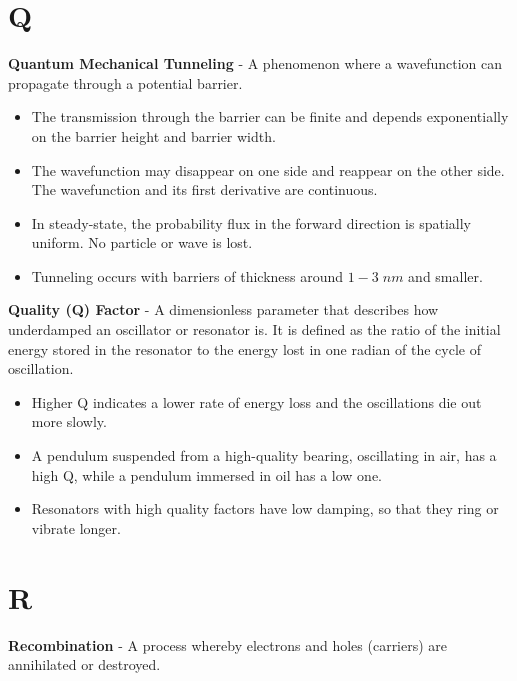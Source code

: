 \section{Q}
    \textbf{Quantum Mechanical Tunneling} - A phenomenon where a wavefunction can propagate through a potential barrier.
\vspace{0.15cm}
    \begin{itemize}
        \setlength\itemsep{0.5em}
        \item{The transmission through the barrier can be finite and depends exponentially on the barrier height and barrier width.}
        \item{The wavefunction may disappear on one side and reappear on the other side. The wavefunction and its first derivative are continuous.}
        \item{In steady-state, the probability flux in the forward direction is spatially uniform. No particle or wave is lost.}
        \item{Tunneling occurs with barriers of thickness around $1-3\;nm$ and smaller.}
    \end{itemize}
\vspace{0.5cm}
    \textbf{Quality (Q) Factor} - A dimensionless parameter that describes how underdamped an oscillator or resonator is. It is defined as the ratio of the initial energy stored in the resonator to the energy lost in one radian of the cycle of oscillation.
    \begin{itemize}
        \setlength\itemsep{0.5em}
        \item{Higher Q indicates a lower rate of energy loss and the oscillations die out more slowly.}
        \item{A pendulum suspended from a high-quality bearing, oscillating in air, has a high Q, while a pendulum immersed in oil has a low one.}
        \item{Resonators with high quality factors have low damping, so that they ring or vibrate longer.}
    \end{itemize}
\section{R}
    \textbf{Recombination} - A process whereby electrons and holes (carriers) are annihilated or destroyed.

